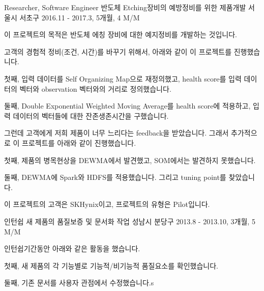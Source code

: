 \begin{cventries}
  \cventry
    {Researcher, Software Engineer} %
    {반도체 Etching장비의 예방정비를 위한 제품개발} %
    {서울시 서초구} %
    {2016.11 - 2017.3, 5개월, 4 M/M} %
    {
      \begin{cvitems} %
        \item {이 프로젝트의 목적은 반도체 에칭 장비에 대한 예지정비를 개발하는 것입니다.}
        \item {고객의 경험적 정비(조건, 시간)를 바꾸기 위해서, 아래와 같이 이 프로젝트를 진행했습니다.}
        \item {첫째, 입력 데이터를 Self Organizing Map으로 재정의했고, health score를 입력 데이터의 벡터와 observation 벡터와의 거리로 정의했습니다.}
        \item {둘째, Double Exponential Weighted Moving Average를 health score에 적용하고, 입력 데이터의 벡터들에 대한 잔존생존시간을 구했습니다.}
        \item {그런데 고객에게 저희 제품이 너무 느리다는 feedback을 받았습니다. 그래서 추가적으로 이 프로젝트를 아래와 같이 진행했습니다.}
        \item {첫째, 제품의 병목현상을 DEWMA에서 발견했고, SOM에서는 발견하지 못했습니다.}
        \item {둘째, DEWMA에 Spark와 HDFS를 적용했습니다. 그리고 tuning point를 찾았습니다.}
        \item {이 프로젝트의 고객은 SKHynix이고, 프로젝트의 유형은 Pilot입니다.}
      \end{cvitems}
    }

  \cventry
    {인턴쉽} %
    {새 제품의 품질보증 및 문서화 작업} %
    {성남시 분당구} %
    {2013.8 - 2013.10, 3개월, 5 M/M} %
    {
      \begin{cvitems} %
        \item {인턴쉽기간동안 아래와 같은 활동을 했습니다.}
        \item {첫째, 새 제품의 각 기능별로 기능적/비기능적 품질요소를 확인했습니다.}
        \item {둘째, 기존 문서를 사용자 관점에서 수정했습니다.s}
      \end{cvitems}
    }

\end{cventries}
